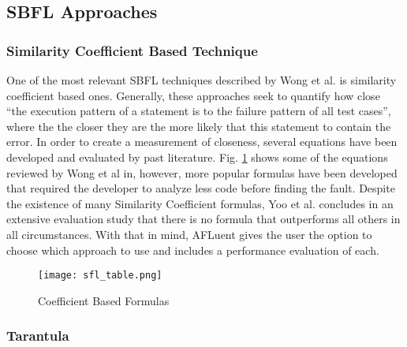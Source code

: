 \subsection{SBFL Approaches}
\label{subsec:sbfl}

\subsubsection{Similarity Coefficient Based Technique}
\label{subsubsec:coefficient_based}

One of the most relevant SBFL techniques described by Wong et al.
\cite{wong2016survey} is similarity coefficient based ones. Generally, these approaches
seek to quantify how close ``the execution pattern of a statement is to the
failure pattern of all test cases'', where the the closer they are the more
likely that this statement to contain the error. In order to create a
measurement of closeness, several equations have been developed and evaluated by
past literature. Fig. \ref{fig:sbfl_eq} shows some of the equations reviewed by
Wong et al in, however, more popular formulas have been developed that
required the developer to analyze less code before finding the fault. Despite
the existence of many Similarity Coefficient formulas, Yoo et al.
\cite{yoo2014no} concludes in an extensive evaluation study that there is no
formula that outperforms all others in all circumstances. With that in mind,
AFLuent gives the user the option to choose which approach to use and includes
a performance evaluation of each.

\begin{figure}[!htb]
	\begin{center}
		\texttt{[image: sfl\_table.png]}
		\caption{\label{fig:sbfl_eq} Coefficient Based Formulas \cite{wong2016survey}}
	\end{center}
\end{figure}

\subsubsection{Tarantula}
\label{subsubsec:tarantula_lit}

